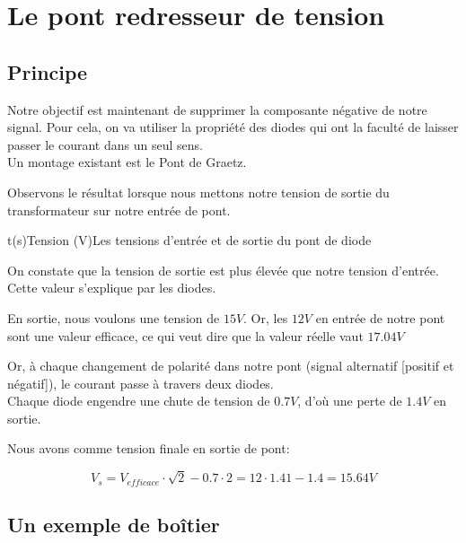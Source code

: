     \newpage 
  \section{Le pont redresseur de tension}

  \subsection{Principe}
  Notre objectif est maintenant de supprimer la composante négative de notre signal. Pour cela, on va utiliser la propriété des 
  diodes qui ont la faculté de laisser passer le courant dans un seul sens.\\
  Un montage existant est le Pont de Graetz. 


  Observons le résultat lorsque nous mettons notre tension de sortie du transformateur sur notre entrée de pont.

  \begin{graphicFigure}{0.6}{0.6}{0}{0.08}{-20}{20}{t(s)}{Tension (V)}{Les tensions d'entrée et de sortie du pont de diode}
    \end{graphicFigure}

  On constate que la tension de sortie est plus élevée que notre tension d'entrée.\\
  Cette valeur s'explique par les diodes. 
  
  En sortie, nous voulons une tension de \(15V\). Or, les $12V$ en entrée de notre pont sont une valeur efficace, ce qui veut dire 
  que la valeur réelle vaut $17.04V$

  Or, à chaque changement de polarité dans notre pont (signal alternatif [positif et négatif]), le courant passe à travers 
  deux diodes.\\

  Chaque diode engendre une chute de tension de $0.7V$, d'où une perte de $1.4V$ en sortie.

  Nous avons comme tension finale en sortie de pont: 

  $$V_{s} = V_{efficace}\cdot \sqrt{2} - 0.7\cdot 2 = 12\cdot 1.41 -1.4 = 15.64 V$$


  \subsection{Un exemple de boîtier}


